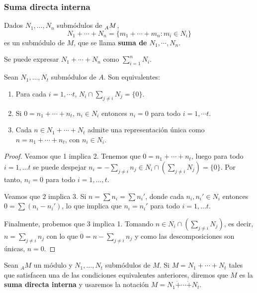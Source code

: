 \subsubsection{Suma directa interna}

\begin{df}
  Dados \(N_1,\ldots, N_n\) submódulos de \(\prescript{}{A}{M}\),
  \[
    N_1+\cdots+ N_n=\{m_1+\cdots+m_n: m_i\in N_i\}
  \]
  es un submódulo de \(M\), que se llama \textbf{suma de \(N_1, \cdots, N_n\)}.
\end{df}

\begin{nt}
  Se puede expresar \(N_1+\cdots+ N_n\) como \(\sum_{i=1}^n N_i\).
\end{nt}

\begin{prop}
  Sean \(N_1,\ldots, N_t\) submódulos de \(A\). Son equivalentes:
  \begin{enumerate}
    \item Para cada \(i = 1, \cdots t\), \(N_i\cap\sum_{j\neq i}N_j =\{0\}\).
    \item Si \(0=n_1+\cdots+n_t\), \(n_i\in N_i\) entonces \(n_i=0\)
      para todo \(i = 1, \cdots t\).
    \item Cada \(n\in N_1+\cdots+N_t\) admite una representación
      única como \(n=n_1+\cdots+n_t\), con \(n_i\in N_i\).
  \end{enumerate}
\end{prop}
\begin{proof}
  Veamos que 1 implica 2. Tenemos que \(0=n_1+\cdots+n_t\), luego para todo
  \(i = 1, \ldots t\) se puede despejar \(n_i=-\sum_{j\neq i} n_j\in N_i\cap\left(
    \sum_{j\neq i} N_j\right)=\{0\}\). Por tanto, \(n_i = 0\) para todo \(i = 1, \ldots,
  t\).

  Veamos que 2 implica 3. Si \(n=\sum n_i=\sum n_i'\), donde cada \(n_i, n_i' \in N_i\)
  entonces \(0=\sum(n_i-n_i')\), lo que implica que
  \(n_i=n_i'\) para todo \(i = 1, \ldots t\).
 
  Finalmente, probemos que 3 implica 1. Tomando \(n \in N_i\cap\left(
  \sum_{j\neq i} N_j\right)\), es decir,
  \(n=\sum_{j\neq i}n_j\) con lo que
  \(0=n-\sum_{j\neq i} n_j\) y como las descomposiciones
  son únicas, \(n=0\).
\end{proof}

\begin{df}
  Sean \({}_AM\) un módulo y \(N_1, \ldots, N_t\) submódulos de \(M\). Si
  \(M=N_1+\cdots+ N_t\) tales que satisfacen una de las condiciones
  equivalentes anteriores, diremos que \(M\) es la \textbf{suma directa interna}
  y usaremos la notación \(M=N_1\dot{+}\cdots\dot{+} N_t\).
\end{df}

